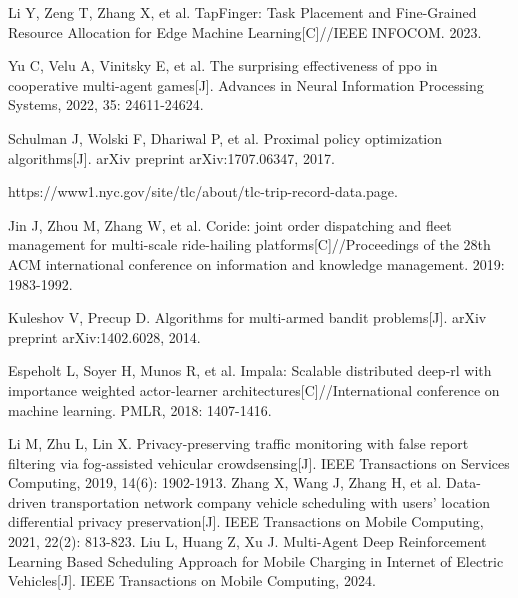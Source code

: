 \begin{thebibliography}{00}
 Li Y, Zeng T, Zhang X, et al. TapFinger: Task Placement and Fine-Grained Resource Allocation for Edge Machine Learning[C]//IEEE INFOCOM. 2023.

 Yu C, Velu A, Vinitsky E, et al. The surprising effectiveness of ppo in cooperative multi-agent games[J]. Advances in Neural Information Processing Systems, 2022, 35: 24611-24624.

 Schulman J, Wolski F, Dhariwal P, et al. Proximal policy optimization algorithms[J]. arXiv preprint arXiv:1707.06347, 2017.


 https://www1.nyc.gov/site/tlc/about/tlc-trip-record-data.page.

 Jin J, Zhou M, Zhang W, et al. Coride: joint order dispatching and fleet management for multi-scale ride-hailing platforms[C]//Proceedings of the 28th ACM international conference on information and knowledge management. 2019: 1983-1992.

 Kuleshov V, Precup D. Algorithms for multi-armed bandit problems[J]. arXiv preprint arXiv:1402.6028, 2014.

 Espeholt L, Soyer H, Munos R, et al. Impala: Scalable distributed deep-rl with importance weighted actor-learner architectures[C]//International conference on machine learning. PMLR, 2018: 1407-1416.

 Li M, Zhu L, Lin X. Privacy-preserving traffic monitoring with false report filtering via fog-assisted vehicular crowdsensing[J]. IEEE Transactions on Services Computing, 2019, 14(6): 1902-1913.
Zhang X, Wang J, Zhang H, et al. Data-driven transportation network company vehicle scheduling with users’ location differential privacy preservation[J]. IEEE Transactions on Mobile Computing, 2021, 22(2): 813-823.
Liu L, Huang Z, Xu J. Multi-Agent Deep Reinforcement Learning Based Scheduling Approach for Mobile Charging in Internet of Electric Vehicles[J]. IEEE Transactions on Mobile Computing, 2024.



\end{thebibliography}
\vspace{12pt}
\color{red}
